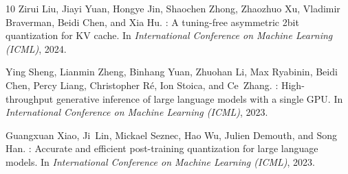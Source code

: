 \documentclass[11pt]{article}
\begin{document}
\begin{thebibliography}{10}
Zirui Liu, Jiayi Yuan, Hongye Jin, Shaochen Zhong, Zhaozhuo Xu, Vladimir
  Braverman, Beidi Chen, and Xia Hu.
: A tuning-free asymmetric 2bit quantization for {KV} cache.
\newblock In {\em International Conference on Machine Learning (ICML)}, 2024.

Ying Sheng, Lianmin Zheng, Binhang Yuan, Zhuohan Li, Max Ryabinin, Beidi Chen,
  Percy Liang, Christopher R{\'e}, Ion Stoica, and Ce~Zhang.
: High-throughput generative inference of large language
  models with a single {GPU}.
\newblock In {\em International Conference on Machine Learning (ICML)}, 2023.

Guangxuan Xiao, Ji~Lin, Mickael Seznec, Hao Wu, Julien Demouth, and Song Han.
: Accurate and efficient post-training quantization for
  large language models.
\newblock In {\em International Conference on Machine Learning (ICML)}, 2023.

\end{thebibliography}
\end{document}
